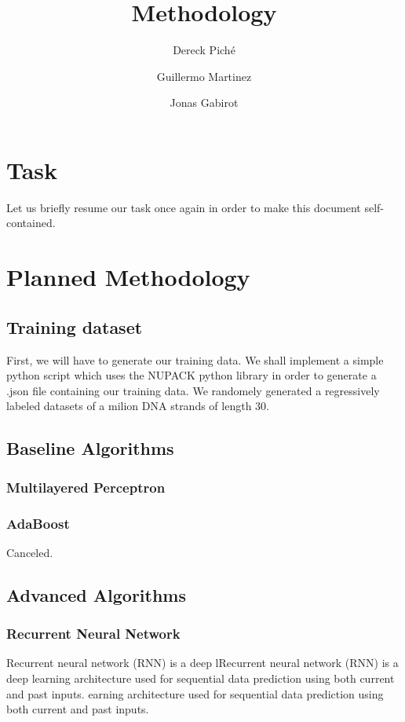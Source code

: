 \documentclass{article}
\title{Methodology}
\author
{
    Dereck Piché \and
    Guillermo Martinez \and
    Jonas Gabirot \and
}
\begin{document}
\maketitle

\section{Task}
Let us briefly resume our task once again in order to make this document
self-contained.

\section{Planned Methodology}
\subsection{Training dataset}
First, we will have to generate our training data. We shall implement a 
simple python script which uses the NUPACK python library in order
to generate a .json file containing our training data. We randomely 
generated a regressively labeled datasets of a milion DNA strands of length $30$.
\subsection{Baseline Algorithms}

\subsubsection{Multilayered Perceptron}

\subsubsection{AdaBoost}
Canceled.

\subsection{Advanced Algorithms}

\subsubsection{Recurrent Neural Network}
Recurrent neural network (RNN) is a deep lRecurrent neural network 
(RNN) is a deep learning architecture used for sequential data prediction
using both current and past inputs. earning architecture used for sequential 
data prediction using both current and past inputs. 
\end{document}
